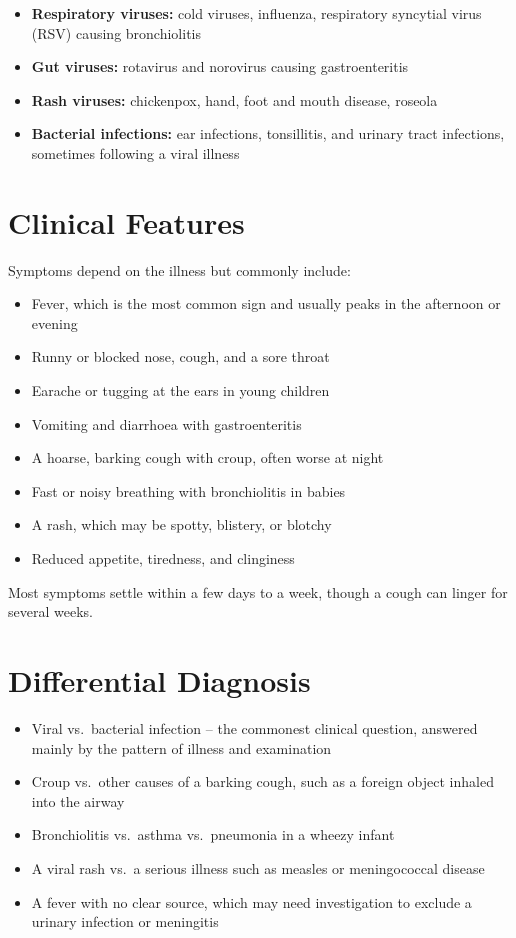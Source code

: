 \begin{itemize}
    \item \textbf{Respiratory viruses:} cold viruses, influenza, respiratory syncytial virus (RSV) causing bronchiolitis
    \item \textbf{Gut viruses:} rotavirus and norovirus causing gastroenteritis
    \item \textbf{Rash viruses:} chickenpox, hand, foot and mouth disease, roseola
    \item \textbf{Bacterial infections:} ear infections, tonsillitis, and urinary tract infections, sometimes following a viral illness
\end{itemize}
\section*{Clinical Features}
Symptoms depend on the illness but commonly include:

\begin{itemize}
    \item Fever, which is the most common sign and usually peaks in the afternoon or evening
    \item Runny or blocked nose, cough, and a sore throat
    \item Earache or tugging at the ears in young children
    \item Vomiting and diarrhoea with gastroenteritis
    \item A hoarse, barking cough with croup, often worse at night
    \item Fast or noisy breathing with bronchiolitis in babies
    \item A rash, which may be spotty, blistery, or blotchy
    \item Reduced appetite, tiredness, and clinginess
\end{itemize}
Most symptoms settle within a few days to a week, though a cough can linger for several weeks.

\section*{Differential Diagnosis}
\begin{itemize}
    \item Viral vs.\ bacterial infection -- the commonest clinical question, answered mainly by the pattern of illness and examination
    \item Croup vs.\ other causes of a barking cough, such as a foreign object inhaled into the airway
    \item Bronchiolitis vs.\ asthma vs.\ pneumonia in a wheezy infant
    \item A viral rash vs.\ a serious illness such as measles or meningococcal disease
    \item A fever with no clear source, which may need investigation to exclude a urinary infection or meningitis
\end{itemize}

